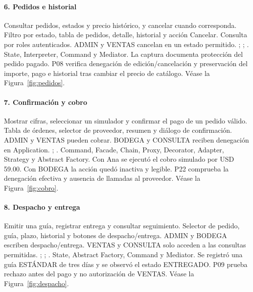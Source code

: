 \clearpage
\paragraph{6. Pedidos e historial}
 Consultar pedidos, estados y precio histórico, y cancelar cuando corresponda.
 Filtro por estado, tabla de pedidos, detalle, historial y acción Cancelar.
 Consulta por roles autenticados. ADMIN y VENTAS cancelan en un estado permitido.
 ; ; .
 State, Interpreter, Command y Mediator.
 La captura documenta protección del pedido pagado. P08 verifica denegación de edición/cancelación y preservación del importe, pago e historial tras cambiar el precio de catálogo. Véase la Figura~\ref{fig:pedidos}.

\clearpage
\paragraph{7. Confirmación y cobro}
 Mostrar cifras, seleccionar un simulador y confirmar el pago de un pedido válido.
 Tabla de órdenes, selector de proveedor, resumen y diálogo de confirmación.
 ADMIN y VENTAS pueden cobrar. BODEGA y CONSULTA reciben denegación en Application.
 ; .
 Command, Facade, Chain, Proxy, Decorator, Adapter, Strategy y Abstract Factory.
 Con Ana se ejecutó el cobro simulado por USD 59.00. Con BODEGA la acción quedó inactiva y legible. P22 comprueba la denegación efectiva y ausencia de llamadas al proveedor. Véase la Figura~\ref{fig:cobro}.

\clearpage
\paragraph{8. Despacho y entrega}
 Emitir una guía, registrar entrega y consultar seguimiento.
 Selector de pedido, guía, plazo, historial y botones de despacho/entrega.
 ADMIN y BODEGA escriben despacho/entrega. VENTAS y CONSULTA solo acceden a las consultas permitidas.
 ; ; .
 State, Abstract Factory, Command y Mediator.
 Se registró una guía ESTÁNDAR de tres días y se observó el estado ENTREGADO. P09 prueba rechazo antes del pago y no autorización de VENTAS. Véase la Figura~\ref{fig:despacho}.

